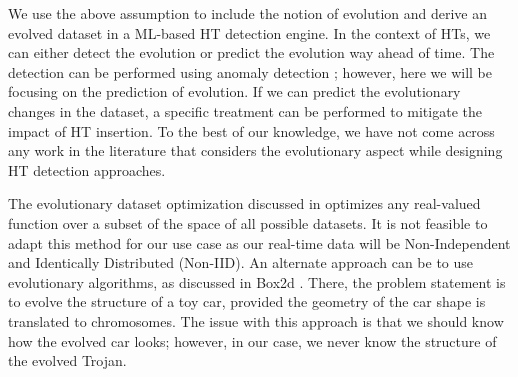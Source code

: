 We use the above assumption to include the notion of evolution and derive an evolved dataset in a ML-based HT detection engine. In the context of HTs, we can either detect the evolution or predict the evolution way ahead of time. The detection can be performed using anomaly detection \cite{liu2022anomaly}; however, here we will be focusing on the prediction of evolution. If we can predict the evolutionary changes in the dataset, a specific treatment can be performed to mitigate the impact of HT insertion. To the best of our knowledge, we have not come across any work in the literature that considers the evolutionary aspect while designing HT detection approaches.

The evolutionary dataset optimization discussed in \cite{edo-paper} optimizes any real-valued function over a subset of the space of all possible datasets. It is not feasible to adapt this method for our use case as our real-time data will be Non-Independent and Identically Distributed (Non-IID). An alternate approach can be to use evolutionary algorithms, as discussed in Box2d \cite{catto2010box2d}. There, the problem statement is to evolve the structure of a toy car, provided the geometry of the car shape is translated to chromosomes. The issue with this approach is that we should know how the evolved car looks; however, in our case, we never know the structure of the evolved Trojan.

